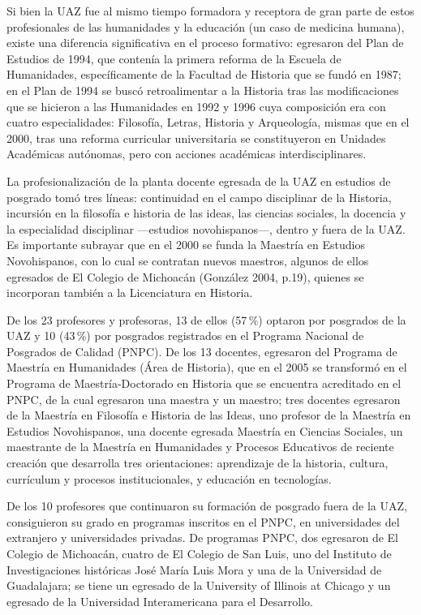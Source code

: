 {Si bien la UAZ fue al mismo tiempo formadora y receptora de gran parte de
estos profesionales de las humanidades y la educación (un caso de medicina
humana), existe una diferencia significativa en el proceso formativo:
egresaron del Plan de Estudios de 1994, que contenía la primera reforma de
la Escuela de Humanidades, específicamente de la Facultad de Historia que
se fundó en 1987; en el Plan de 1994 se buscó retroalimentar a la Historia
tras las modificaciones que se hicieron a las Humanidades en 1992 y 1996
cuya composición era con cuatro especialidades: Filosofía, Letras, Historia
y Arqueología, mismas que en el 2000, tras una reforma curricular
universitaria se constituyeron en Unidades Académicas autónomas, pero con
acciones académicas interdisciplinares. 


La profesionalización de la planta docente egresada de la UAZ en estudios de
posgrado tomó tres líneas: continuidad en el campo disciplinar de la
Historia, incursión en la filosofía e historia de las ideas, las ciencias
sociales, la docencia y la especialidad disciplinar ---estudios
novohispanos---, dentro y fuera de la UAZ. Es importante subrayar que en el
2000 se funda la Maestría en Estudios Novohispanos, con lo cual se
contratan nuevos maestros, algunos de ellos egresados de El Colegio de
Michoacán (González 2004, p.19), quienes se incorporan también a la
Licenciatura en Historia.}

De los 23 profesores y profesoras, 13 de ellos (57\,\%) optaron por posgrados
de la UAZ y 10 (43\,\%) por posgrados registrados en el Programa Nacional de
Posgrados de Calidad (PNPC). De los 13 docentes, egresaron del Programa
de Maestría en Humanidades (Área de Historia), que en el 2005 se transformó en el
Programa de Maes\-tría-Doc\-to\-ra\-do en Historia que se encuentra acreditado en
el PNPC, de la cual egresaron una maestra y un maestro; tres docentes
egresaron  de la  Maestría en Filosofía e Historia de las Ideas,  uno
profesor de la  Maestría en Estudios Novohispanos, una docente egresada
Maestría en Ciencias Sociales, un maestrante de la Maestría en Humanidades
y Procesos Educativos de reciente creación que desarrolla tres
orientaciones: aprendizaje de la historia, cultura, currículum y procesos
institucionales, y educación en tecnologías. 


De los 10 profesores que continuaron su formación de posgrado fuera de la
UAZ, consiguieron su grado en programas inscritos en el PNPC, en
universidades del extranjero y universidades privadas. De programas PNPC,
dos egresaron de El Colegio de Michoacán,  cuatro de El Colegio de San
Luis, uno del  Instituto de Investigaciones históricas José María Luis Mora
y una de la Universidad de Guadalajara; se tiene un egresado de  la
University of Illinois at Chicago y un egresado de la Universidad
Interamericana para el Desarrollo. 

